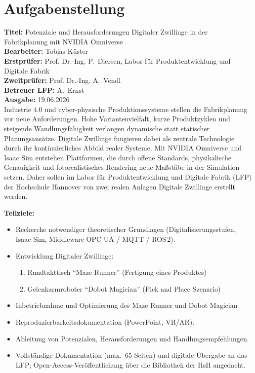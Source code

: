 \newpage
\section*{Aufgabenstellung}
\textbf{Titel:} Potenziale und Herausforderungen Digitaler Zwillinge in der Fabrikplanung mit NVIDIA Omniverse\\[0.5em]
\textbf{Bearbeiter:} Tobias Küster\\
\textbf{Erstprüfer:} Prof. Dr.-Ing. P.\ Diersen, Labor für Produktentwicklung und Digitale Fabrik\\
\textbf{Zweitprüfer:} Prof. Dr.-Ing. A.\ Vendl\\
\textbf{Betreuer LFP:} A.\ Ernst\\
\textbf{Ausgabe:} 19.06.2026\\[1em]

Industrie 4.0 und cyber-physische Produktionssysteme stellen die Fabrikplanung vor neue Anforderungen. Hohe Variantenvielfalt, kurze Produktzyklen und steigende Wandlungsfähigkeit verlangen dynamische statt statischer Planungsansätze. Digitale Zwillinge fungieren dabei als zentrale Technologie durch ihr kontinuierliches Abbild realer Systeme. Mit NVIDIA Omniverse und Isaac Sim entstehen Plattformen, die durch offene Standards, physikalische Genauigkeit und fotorealistisches Rendering neue Maßstäbe in der Simulation setzen. Daher sollen im Labor für Produktentwicklung und Digitale Fabrik (LFP) der Hochschule Hannover von zwei realen Anlagen Digitale Zwillinge erstellt werden.

\textbf{Teilziele:}
\begin{itemize}
    \item Recherche notwendiger theoretischer Grundlagen (Digitalisierungsstufen, Isaac Sim, Middleware OPC UA / MQTT / ROS\,2).
    \item Entwicklung Digitaler Zwillinge:
    \begin{enumerate}
        \item Rundtakttisch \enquote{Maze Runner} (Fertigung eines Produktes)
        \item Gelenkarmroboter \enquote{Dobot Magician} (Pick and Place Szenario)
    \end{enumerate}
    \item Inbetriebnahme und Optimierung des Maze Runner und Dobot Magician
    \item Reproduzierbarkeitsdokumentation (PowerPoint, VR/AR).
    \item Ableitung von Potenzialen, Herausforderungen und Handlungsempfehlungen.
    \item Vollständige Dokumentation (max.\ 65 Seiten) und digitale Übergabe an das LFP; Open-Access-Veröffentlichung über die Bibliothek der HsH angedacht.
\end{itemize}
